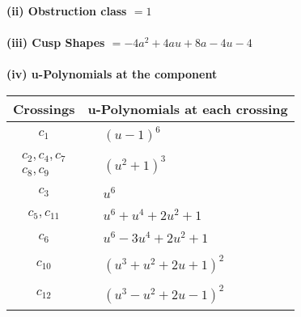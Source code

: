 \documentclass[1p]{elsarticle_modified}
\theoremstyle{definition}
\begin{document}
\flushleft \textbf{(ii) Obstruction class $= 1$}\\~\\
\flushleft \textbf{(iii) Cusp Shapes $= -4 a^2+4 a u+8 a-4 u-4$}\\~\\
\newpage\renewcommand{\arraystretch}{1}
\flushleft \textbf{(iv) u-Polynomials at the component}\newline \\
\begin{tabular}{m{50pt}|m{274pt}}
Crossings & \hspace{64pt}u-Polynomials at each crossing \\
\hline $$\begin{aligned}c_{1}\end{aligned}$$&$\begin{aligned}
&(u-1)^6
\end{aligned}$\\
\hline $$\begin{aligned}c_{2},c_{4},c_{7}\\c_{8},c_{9}\end{aligned}$$&$\begin{aligned}
&(u^2+1)^3
\end{aligned}$\\
\hline $$\begin{aligned}c_{3}\end{aligned}$$&$\begin{aligned}
&u^6
\end{aligned}$\\
\hline $$\begin{aligned}c_{5},c_{11}\end{aligned}$$&$\begin{aligned}
&u^6+u^4+2 u^2+1
\end{aligned}$\\
\hline $$\begin{aligned}c_{6}\end{aligned}$$&$\begin{aligned}
&u^6-3 u^4+2 u^2+1
\end{aligned}$\\
\hline $$\begin{aligned}c_{10}\end{aligned}$$&$\begin{aligned}
&(u^3+u^2+2 u+1)^2
\end{aligned}$\\
\hline $$\begin{aligned}c_{12}\end{aligned}$$&$\begin{aligned}
&(u^3- u^2+2 u-1)^2
\end{aligned}$\\
\hline
\end{tabular}\\~\\
\end{document}
